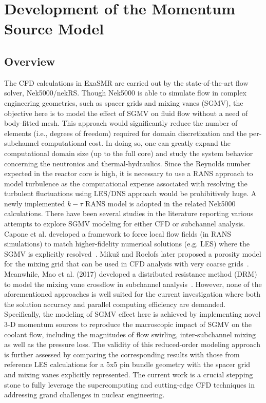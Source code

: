 \section{Development of the Momentum Source Model}
\label{sec:msm}

\subsection{Overview}
\label{sec:msm1}

The CFD calculations in ExaSMR are carried out by the state-of-the-art flow solver, Nek5000/nekRS.
Though Nek5000 is able to simulate flow in complex engineering geometries, such as spacer grids and mixing vanes (SGMV)\cite{BUSCO2019144}, the objective here is to model the effect of SGMV on fluid flow without a need of body-fitted mesh.
This approach would significantly reduce the number of elements (i.e., degrees of freedom) required for domain discretization and the per-subchannel computational cost. In doing so, one can greatly expand the computational domain size (up to the full core) and study the system behavior concerning the neutronics and thermal-hydraulics.
Since the Reynolds number expected in the reactor core is high, it is necessary to use a RANS approach to model turbulence as the computational expense associated with resolving the turbulent fluctuations using LES/DNS approach would be prohibitively huge.
A newly implemented $k-\tau$ RANS model is adopted in the related Nek5000 calculations.
There have been several studies in the literature reporting various attempts to explore SGMV modeling for either CFD or subchannel analysis.
Capone et al. developed a framework to force local flow fields (in RANS simulations) to match higher-fidelity numerical solutions (e.g. LES) where the SGMV is explicitly resolved~\cite{Capone2016}.
Mikuž and Roelofs later proposed a porosity model for the mixing grid that can be used in CFD analysis with very coarse grids~\cite{Mikuz2020}.
Meanwhile, Mao et al. (2017) developed a distributed resistance method (DRM) to model the mixing vane crossflow in subchannel analysis~\cite{Mao2017}.
However, none of the aforementioned approaches is well suited for the current investigation where both the solution accuracy and parallel computing efficiency are demanded.
Specifically, the modeling of SGMV effect here is achieved by implementing novel 3-D momentum sources to reproduce the macroscopic impact of SGMV on the coolant flow, including the magnitudes of flow swirling, inter-subchannel mixing as well as the pressure loss.
The validity of this reduced-order modeling approach is further assessed by comparing the corresponding results with those from reference LES calculations for a 5x5 pin bundle geometry with the spacer grid and mixing vanes explicitly represented.
The current work is a crucial stepping stone to fully leverage the supercomputing and cutting-edge CFD techniques in addressing grand challenges in nuclear engineering.


